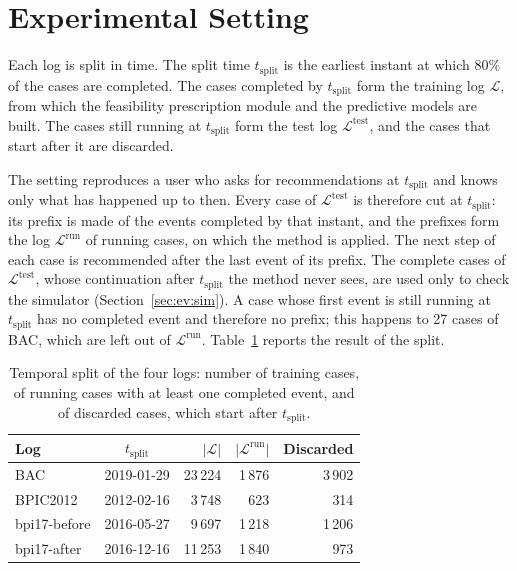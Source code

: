 \section{Experimental Setting}
\label{sec:ev:setting}
Each log is split in time. The split time $t_{\mathrm{split}}$ is the
earliest instant at which 80\% of the cases are completed. The cases
completed by $t_{\mathrm{split}}$ form the training log $\mathcal{L}$, from
which the feasibility prescription module and the predictive models are
built. The cases still running at $t_{\mathrm{split}}$ form the test log
$\mathcal{L}^{\mathrm{test}}$, and the cases that start after it are
discarded.

The setting reproduces a user who asks for recommendations at
$t_{\mathrm{split}}$ and knows only what has happened up to then. Every case
of $\mathcal{L}^{\mathrm{test}}$ is therefore cut at $t_{\mathrm{split}}$:
its prefix is made of the events completed by that instant, and the prefixes
form the log $\mathcal{L}^{\mathrm{run}}$ of running cases, on which the
method is applied. The next step of each case is recommended after the last
event of its prefix. The complete cases of $\mathcal{L}^{\mathrm{test}}$,
whose continuation after $t_{\mathrm{split}}$ the method never sees, are used
only to check the simulator (Section~\ref{sec:ev:sim}). A case whose first
event is still running at $t_{\mathrm{split}}$ has no completed event and
therefore no prefix; this happens to 27 cases of BAC, which are left out of
$\mathcal{L}^{\mathrm{run}}$. Table~\ref{tab:ev:split} reports the result of
the split.

\begin{table}[h]
  \centering
  \small
  \begin{tabular}{lcrrr}
    \toprule
    Log & $t_{\mathrm{split}}$ & $\lvert \mathcal{L} \rvert$ &
      $\lvert \mathcal{L}^{\mathrm{run}} \rvert$ & Discarded \\
    \midrule
    BAC          & 2019-01-29 & 23\,224 & 1\,876 & 3\,902 \\
    BPIC2012     & 2012-02-16 &  3\,748 &    623 &    314 \\
    bpi17-before & 2016-05-27 &  9\,697 & 1\,218 & 1\,206 \\
    bpi17-after  & 2016-12-16 & 11\,253 & 1\,840 &    973 \\
    \bottomrule
  \end{tabular}
  \caption{Temporal split of the four logs: number of training cases, of
    running cases with at least one completed event, and of discarded cases,
    which start after $t_{\mathrm{split}}$.}
  \label{tab:ev:split}
\end{table}


